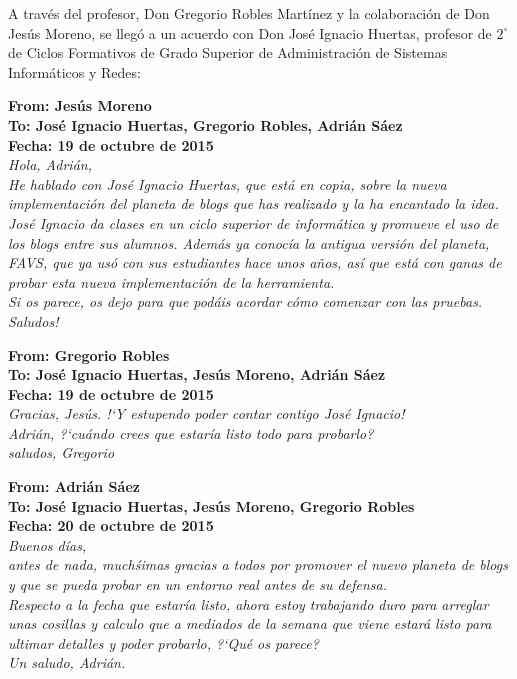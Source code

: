 \documentclass[a4paper, 12pt]{book}
\begin{document}
A trav\'es del profesor, Don Gregorio Robles Mart\'inez y la colaboraci\'on de Don Jes\'us Moreno, se lleg\'o a un acuerdo con Don Jos\'e 
Ignacio Huertas, profesor de $2^\circ$ de Ciclos Formativos de Grado Superior de Administraci\'on de Sistemas Inform\'aticos y Redes:

\begin{shaded}
\noindent\textbf{\textsf{
From: Jes\'us Moreno\\
To: Jos\'e Ignacio Huertas, Gregorio Robles, Adri\'an S\'aez\\
Fecha: 19 de octubre de 2015\\
}}
\emph{
Hola, Adri\'an,\\
He hablado con Jos\'e Ignacio Huertas, que est\'a en copia, sobre la nueva implementaci\'on del planeta de blogs que has realizado y la ha 
encantado la idea. \\
Jos\'e Ignacio da clases en un ciclo superior de inform\'atica y promueve el uso de los blogs entre sus alumnos. Adem\'as ya conoc\'ia la 
antigua versi\'on del planeta, FAVS, que ya us\'o con sus estudiantes hace unos a\~nos, as\'i que est\'a con ganas de probar esta nueva 
implementaci\'on de la herramienta.\\
Si os parece, os dejo para que pod\'ais acordar c\'omo comenzar con las pruebas.\\
Saludos!
}
\end{shaded}

\begin{shaded}
\noindent\textbf{\textsf{
From: Gregorio Robles\\
To: Jos\'e Ignacio Huertas, Jes\'us Moreno, Adri\'an S\'aez\\
Fecha: 19 de octubre de 2015\\
}}
\emph{
Gracias, Jes\'us. !`Y estupendo poder contar contigo Jos\'e Ignacio!\\
Adri\'an, ?`cu\'ando crees que estar\'ia listo todo para probarlo?\\
saludos, Gregorio
}
\end{shaded}

\begin{shaded}
\noindent\textbf{\textsf{
From: Adri\'an S\'aez\\
To: Jos\'e Ignacio Huertas, Jes\'us Moreno, Gregorio Robles\\
Fecha: 20 de octubre de 2015\\
}}
\emph{
Buenos d\'ias,\\
antes de nada, much\'simas gracias a todos por promover el nuevo planeta de blogs y que se pueda probar en un entorno real antes de su defensa.\\
Respecto a la fecha que estar\'ia listo, ahora estoy trabajando duro para arreglar unas cosillas y calculo que a mediados de la semana que viene estar\'a listo para 
ultimar detalles y poder probarlo, ?`Qu\'e os parece?\\
Un saludo, Adri\'an.
}
\end{shaded}
\end{document}
